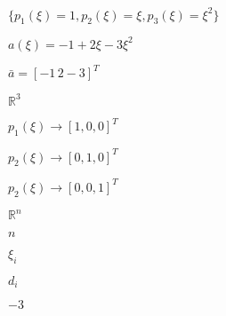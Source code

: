 \documentclass[10pt]{book}
\begin{document}
\begin{mdSnippets}
\begin{mdInlineSnippet}[3f2d67e161ece4d43c3a5de32b624a95]%
$\{p_1(\xi)=1,p_2(\xi)=\xi,p_3(\xi)=\xi^2\}$\end{mdInlineSnippet}%
\begin{mdInlineSnippet}[9999d80572c6085a05109d0949e7461a]%
$a(\xi)=-1+2\xi-3\xi^2$\end{mdInlineSnippet}%
\begin{mdInlineSnippet}%
$\bar{a}=[-1\,2-3]^T$\end{mdInlineSnippet}%
\begin{mdInlineSnippet}%
$\mathbb{R}^3$\end{mdInlineSnippet}%
\begin{mdInlineSnippet}[42300e8f224f0215551dca830f8ea6e4]%
$p_1(\xi)\rightarrow [1,0,0]^T$\end{mdInlineSnippet}%
\begin{mdInlineSnippet}%
$p_2(\xi)\rightarrow [0,1,0]^T$\end{mdInlineSnippet}%
\begin{mdInlineSnippet}[2db85da8a691ef9d76ef18fbad87ff76]%
$p_2(\xi)\rightarrow [0,0,1]^T$\end{mdInlineSnippet}%
\begin{mdInlineSnippet}[cf048f74f71721abd7b8df49453d1310]%
$\mathbb{R}^n$\end{mdInlineSnippet}%
\begin{mdInlineSnippet}[7b8b965ad4bca0e41ab51de7b31363a1]%
$n$\end{mdInlineSnippet}%
\begin{mdInlineSnippet}[9ea888f58114108ed02fea555f01fe8c]%
$\xi_i$\end{mdInlineSnippet}%
\begin{mdInlineSnippet}[d247f594c78d0d2be10fc6d82512cc4e]%
$d_i$\end{mdInlineSnippet}%
\begin{mdInlineSnippet}%
$-3$\end{mdInlineSnippet}%
\begin{mdInlineSnippet}[98e74e9689db01915cc605dd3608bf83]%

\end{mdInlineSnippet}
\end{mdSnippets}
\end{document}
